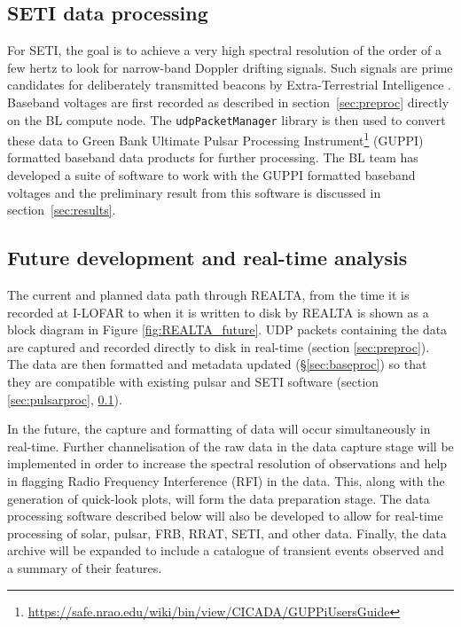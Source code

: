 \subsection{SETI data processing}
\label{sect:pipeline_SETI}
For SETI, the goal is to achieve a very high spectral resolution of the order of a few hertz to look for narrow-band Doppler drifting signals. Such signals are prime candidates for deliberately transmitted beacons by Extra-Terrestrial Intelligence \citep[ETI;][]{Tarter2001}. Baseband voltages are first recorded as described in section~\ref{sec:preproc} directly on the BL compute node. The \texttt{udpPacketManager} library is then used to convert these data to Green Bank Ultimate Pulsar Processing Instrument\footnote{\hyperref[GUPPI]{https://safe.nrao.edu/wiki/bin/view/CICADA/GUPPiUsersGuide}} (GUPPI) formatted baseband data products for further processing. The BL team has developed a suite of software to work with the GUPPI formatted baseband voltages \citep{Lebofsky2019} and the preliminary result from this software is discussed in section~\ref{sec:results}. 

\subsection{Future development and real-time analysis}
\label{sec:future_software}
The current and planned data path through REALTA, from the time it is recorded at I-LOFAR to when it is written to disk by REALTA is shown as a block diagram in Figure \ref{fig:REALTA_future}. UDP packets containing the data are captured and recorded directly to disk in real-time (section \ref{sec:preproc}). The data are then formatted and metadata updated (\S \ref{sec:baseproc}) so that they are compatible with existing pulsar and SETI software (section \ref{sec:pulsarproc}, \ref{sect:pipeline_SETI}).

In the future, the capture and formatting of data will occur simultaneously in real-time. Further channelisation of the raw data in the data capture stage will be implemented in order to increase the spectral resolution of observations and help in flagging Radio Frequency Interference (RFI) in the data. This, along with the generation of quick-look plots, will form the data preparation stage. The data processing software described below will also be developed to allow for real-time processing of solar, pulsar, FRB, RRAT, SETI, and other data. Finally, the data archive will be expanded to include a catalogue of transient events observed and a summary of their features.

